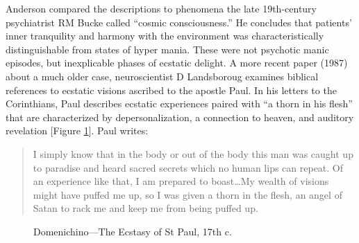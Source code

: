 \documentclass{UIdahoMastersThesis}
\begin{document}
Anderson compared the descriptions to phenomena the late 19th-century psychiatrist RM Bucke called ``cosmic consciousness.'' He concludes that patients' inner tranquility and harmony with the environment was characteristically distinguishable from states of hyper mania. These were not psychotic manic episodes, but inexplicable phases of ecstatic delight.
A more recent paper (1987) about a much older case, neuroscientist D Landsboroug examines biblical references to ecstatic visions ascribed to the apostle Paul. In his letters to the Corinthians, Paul describes ecstatic experiences paired with ``a thorn in his flesh'' that are characterized by depersonalization, a connection to heaven, and auditory revelation [Figure \ref{fig:paul}]. Paul writes:

\begin{quote}
{I simply know that in the body or out of the body this man was caught up to paradise and heard sacred secrets which no human lips can repeat. Of an experience like that, I am prepared to boast\ldots My wealth of visions might have puffed me up, so I was given a thorn in the flesh, an angel of Satan to rack me and keep me from being puffed up.}\cite{bible_new_1984}
\end{quote}

\begin{figure}[h!]
	\centering
	{%
		\setlength{\fboxsep}{0pt}%
		\setlength{\fboxrule}{1.5pt}%
	}%
	\caption{Domenichino---The Ecstasy of St Paul, 17th c.}
	\label{fig:paul}
\end{figure}
\end{document}
